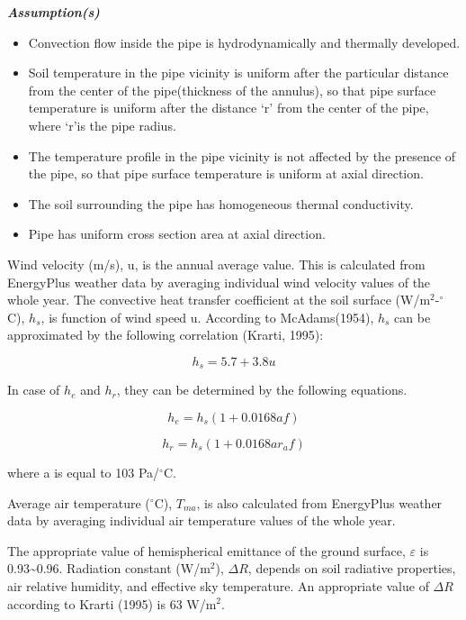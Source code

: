 \emph{\textbf{Assumption(s)}}

\begin{itemize}
\item
  Convection flow inside the pipe is hydrodynamically and thermally developed.
\item
  Soil temperature in the pipe vicinity is uniform after the particular distance from the center of the pipe(thickness of the annulus), so that pipe surface temperature is uniform after the distance `r' from the center of the pipe, where `r'is the pipe radius.
\item
  The temperature profile in the pipe vicinity is not affected by the presence of the pipe, so that pipe surface temperature is uniform at axial direction.
\item
  The soil surrounding the pipe has homogeneous thermal conductivity.
\item
  Pipe has uniform cross section area at axial direction.
\end{itemize}

Wind velocity (m/s), u, is the annual average value. This is calculated from EnergyPlus weather data by averaging individual wind velocity values of the whole year. The convective heat transfer coefficient at the soil surface (W/m\(^{2}\)-\(^{\circ}\)C), \(h_{s}\), is function of wind speed u. According to McAdams(1954), \(h_{s}\) can be approximated by the following correlation (Krarti, 1995):

\begin{equation}
{h_s} = 5.7 + 3.8u
\end{equation}

In case of \(h_{e}\) and \(h_{r}\), they can be determined by the following equations.

\begin{equation}
{h_e} = {h_s}\left( {1 + 0.0168af} \right)
\end{equation}

\begin{equation}
{h_r} = {h_s}\left( {1 + 0.0168a{r_a}f} \right)
\end{equation}

where a is equal to 103 Pa/\(^{\circ}\)C.

Average air temperature (\(^{\circ}\)C), \(T_{ma}\), is also calculated from EnergyPlus weather data by averaging individual air temperature values of the whole year.

The appropriate value of hemispherical emittance of the ground surface, \({\varepsilon}\) is 0.93\textasciitilde{}0.96. Radiation constant (W/m\(^{2}\)), \({\Delta R}\), depends on soil radiative properties, air relative humidity, and effective sky temperature. An appropriate value of \({\Delta R}\) according to Krarti (1995) is 63 W/m\(^{2}\).

